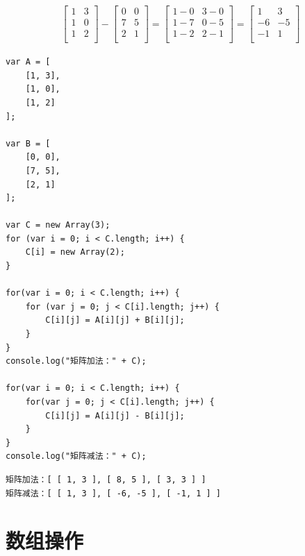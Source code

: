 \begin{align}\nonumber
	\left[\begin{matrix}
			1 & 3 \\
			1 & 0 \\
			1 & 2 \\
		\end{matrix} \right]
	-
	\left[\begin{matrix}
			0 & 0 \\
			7 & 5 \\
			2 & 1 \\
		\end{matrix} \right]
	=
	\left[\begin{matrix}
			1-0 & 3-0 \\
			1-7 & 0-5 \\
			1-2 & 2-1 \\
		\end{matrix} \right]
	=
	\left[\begin{matrix}
			1  & 3  \\
			-6 & -5 \\
			-1 & 1  \\
		\end{matrix} \right]
\end{align}

\begin{lstlisting}[style=htmlcssjs]
var A = [
    [1, 3],
    [1, 0],
    [1, 2]
];
    
var B = [
    [0, 0],
    [7, 5],
    [2, 1]
];

var C = new Array(3);
for (var i = 0; i < C.length; i++) {
    C[i] = new Array(2);
}

for(var i = 0; i < C.length; i++) {
    for (var j = 0; j < C[i].length; j++) {
        C[i][j] = A[i][j] + B[i][j];
    }
}
console.log("矩阵加法：" + C);

for(var i = 0; i < C.length; i++) {
    for(var j = 0; j < C[i].length; j++) {
        C[i][j] = A[i][j] - B[i][j];
    }
}
console.log("矩阵减法：" + C);
\end{lstlisting}

\begin{tcolorbox}
	\begin{verbatim}
矩阵加法：[ [ 1, 3 ], [ 8, 5 ], [ 3, 3 ] ]
矩阵减法：[ [ 1, 3 ], [ -6, -5 ], [ -1, 1 ] ]
	\end{verbatim}
\end{tcolorbox}

\newpage

\section{数组操作}

